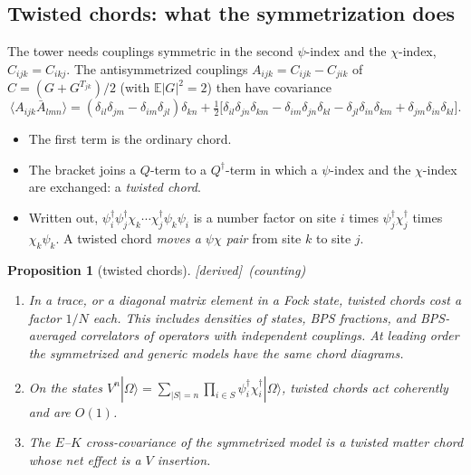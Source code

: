 \documentclass[11pt]{article}
\newcommand{\Om}{|\Omega\rangle}
\newcommand{\tagbox}[2]{\textsf{\small\color{#1}[#2]}}
\newcommand{\DER}{\tagbox{cder}{derived}}
\theoremstyle{plain}
\newtheorem{proposition}{Proposition}
\theoremstyle{remark}
\numberwithin{equation}{section}
\begin{document}
\subsection{Twisted chords: what the symmetrization does}\label{sec:twisted}

The tower needs couplings symmetric in the second $\psi$-index and the $\chi$-index, $C_{ijk}=C_{ikj}$. The
antisymmetrized couplings $A_{ijk}=C_{ijk}-C_{jik}$ of $C=(G+G^{T_{jk}})/2$ (with $\mathbb E|G|^2=2$) then have covariance
\begin{equation}\label{eq:twisted}
\langle A_{ijk}\bar A_{lmn}\rangle=(\delta_{il}\delta_{jm}-\delta_{im}\delta_{jl})\delta_{kn}
+\tfrac12\big[\delta_{il}\delta_{jn}\delta_{km}-\delta_{im}\delta_{jn}\delta_{kl}-\delta_{jl}\delta_{in}\delta_{km}+\delta_{jm}\delta_{in}\delta_{kl}\big].
\end{equation}
\begin{itemize}\itemsep1pt
\item The first term is the ordinary chord.
\item The bracket joins a $Q$-term to a $Q^\dagger$-term in which a $\psi$-index and the $\chi$-index are exchanged: a
  \emph{twisted chord}.
\item Written out, $\psi_i^\dagger\psi_j^\dagger\chi_k\cdots\chi_j^\dagger\psi_k\psi_i$ is a number factor on site $i$
  times $\psi_j^\dagger\chi_j^\dagger$ times $\chi_k\psi_k$. A twisted chord \emph{moves a $\psi\chi$ pair} from site $k$ to
  site $j$.
\end{itemize}

\begin{proposition}[twisted chords]\label{prop:twisted}\DER\ (counting)
\begin{enumerate}\itemsep1pt
\item In a trace, or a diagonal matrix element in a Fock state, twisted chords cost a factor $1/N$ each. This includes
  densities of states, BPS fractions, and BPS-averaged correlators of operators with independent couplings. At leading
  order the symmetrized and generic models have the same chord diagrams.
\item On the states $V^n\Om=\sum_{|S|=n}\prod_{i\in S}\psi_i^\dagger\chi_i^\dagger\Om$, twisted chords act coherently and
  are $O(1)$.
\item The $E$--$K$ cross-covariance of the symmetrized model is a twisted matter chord whose net effect is a $V$
  insertion.
\end{enumerate}
\end{proposition}
\end{document}
